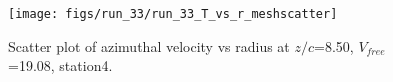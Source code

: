 \begin{figure}[H]
\centering
\texttt{[image: figs/run\_33/run\_33\_T\_vs\_r\_meshscatter]}
\caption{Scatter plot of azimuthal velocity vs radius at $z/c$=8.50, $V_{free}$=19.08, station4.}
\label{fig:run_33_T_vs_r_meshscatter}
\end{figure}


